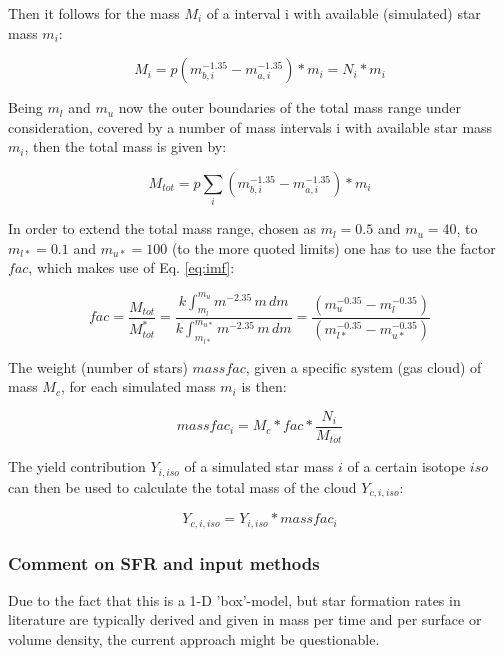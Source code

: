 {Then it follows for the mass $M_i$ of a interval i
with available (simulated) star mass $m_i$:
 
\begin{equation} 
M_i=p ( m_{b,i}^{-1.35} - m_{a,i}^{-1.35} ) * m_i = N_i * m_i
\end{equation}

Being $m_{l}$ and $m_{u}$ now the outer boundaries of the total mass range
under consideration,
covered by a number of mass intervals i with available star mass $m_i$,
then the total mass is given by:

\begin{equation}
M_{tot} = p \sum\limits_{i}( m_{b,i}^{-1.35} - m_{a,i}^{-1.35} ) * m_i
\end{equation}


In order to extend the total mass range, chosen as $m_{l}=0.5$ and $m_{u}=40$,
to $m_{l*}=0.1$ and $m_{u*}=100$ (to the more quoted limits) one has to use the factor $fac$,
which makes use of Eq. \ref{eq:imf}:


\begin{equation}
fac = \frac{M_{tot}}{M^*_{tot}}
= \frac{k \int_{m_l}^{m_u} m^{-2.35}\, m\, dm }{k \int_{m_{l*}}^{m_{u*}} m^{-2.35}\, m\, dm}
= \frac{ ( m_u^{-0.35} - m_l^{-0.35} ) } { ( m_{l*}^{-0.35} - m_{u*}^{-0.35} ) }
\end{equation}

The weight (number of stars) $massfac$, given a specific
system (gas cloud) of mass $M_c$, for each simulated mass $m_i$ is then:


\begin{equation}
massfac_i = M_c * fac * \frac{N_i}{ M_{tot} }
\end{equation}

The yield contribution $Y_{i,iso}$ of a simulated star mass $i$ 
of a certain isotope $iso$ can then be used to calculate
the total mass of the cloud $Y_{c,i,iso}$:

\begin{equation}
Y_{c,i,iso} = Y_{i,iso} * massfac_i
\end{equation}

\subsubsection{Comment on SFR and input methods}

Due to the fact that this is a 1-D 'box'-model,
but star formation rates in literature are 
typically derived and given in mass per time
and per surface or volume density, the current
approach might be questionable.

}
